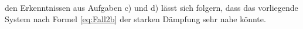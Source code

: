 \justifying den Erkenntnissen aus Aufgaben c) und d) lässt sich folgern, dass das vorliegende System nach Formel 
\eqref{eq:Fall2b} der starken Dämpfung sehr nahe könnte.  

\newpage

\printbibliography





